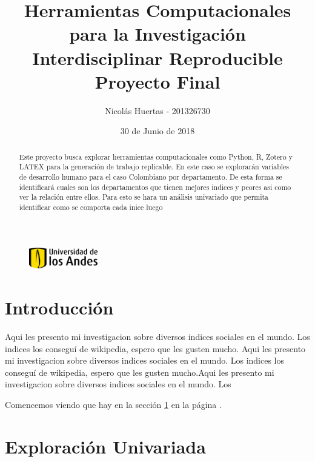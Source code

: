 \documentclass{article}
\title{Herramientas Computacionales para la
 Investigación Interdisciplinar Reproducible  Proyecto Final}
\author[1]{\normalsize Nicolás Huertas - 201326730}
\affil[1]{\small  Departamenta de Ingeniería Industrial ,Universidad de los Andes\\
\texttt{{n.huertas10}@uniandes.edu.col}}
\date{30 de Junio de 2018}
\begin{document}

\begin{figure}
 \centering
 \includegraphics[width = 3cm, height=1cm]{Uandes}
\end{figure}
\maketitle
\begin{abstract}
Este proyecto busca explorar herramientas computacionales como Python, R, Zotero y LATEX para la generación de trabajo replicable. En este caso se explorarán variables de desarrollo humano para el caso Colombiano por departamento. De esta forma se identificará cuales son los departamentos que tienen mejores indices y peores asi como ver la relación entre ellos. Para esto se hara un análisis univariado que permita identificar como se comporta cada inice luego
\end{abstract}

\section*{Introducción}

Aqui les presento mi investigacion sobre diversos indices sociales en el mundo. Los indices los conseguí de wikipedia, espero que les gusten mucho. Aqui les presento mi investigacion sobre diversos indices sociales en el mundo. Los indices los conseguí de wikipedia, espero que les gusten mucho.Aqui les presento mi investigacion sobre diversos indices sociales en el mundo. Los 

 Comencemos viendo que hay en la sección \ref{univariada} en la página \pageref{univariada}.
 

\section{Exploración Univariada}\label{univariada}
 
\end{document}
